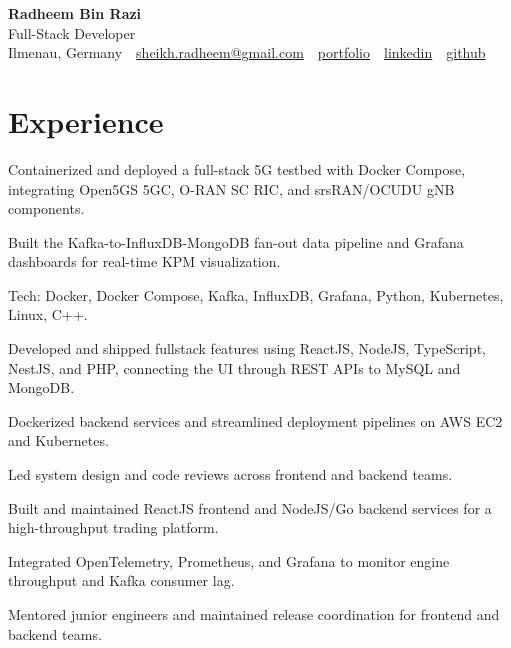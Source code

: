 \documentclass[10pt,a4paper]{resume}
\makeatletter
\newcommand{\Portfolio}{https://radheem.github.io/my-cv}
\newcommand{\PortfolioText}{portfolio}
\newcommand{\GitHub}{https://github.com/radheem}
\newcommand{\LinkedIn}{https://www.linkedin.com/in/radheem-razi}
\newcommand{\Email}{sheikh.radheem@gmail.com}
\makeatother
\begin{document}
\begin{center}
  {\huge\bfseries Radheem Bin Razi}\\[3pt]
  {\large Full-Stack Developer}\\[6pt]
  \small
  Ilmenau, Germany \,\textbar\,
  \href{mailto:\Email}{\Email} \,\textbar\,
  \href{\Portfolio}{\PortfolioText} \,\textbar\,
  \href{\LinkedIn}{linkedin} \,\textbar\,
  \href{\GitHub}{github}
\end{center}
\vspace{2pt}

\section{Experience}

\bullets
  \item Containerized and deployed a full-stack 5G testbed with Docker Compose, integrating Open5GS 5GC, O-RAN SC RIC, and srsRAN/OCUDU gNB components.
  \item Built the Kafka-to-InfluxDB-MongoDB fan-out data pipeline and Grafana dashboards for real-time KPM visualization.
  \item Tech: Docker, Docker Compose, Kafka, InfluxDB, Grafana, Python, Kubernetes, Linux, C++.
\bulletsend
\vspace{1.5pt}
\bullets
  \item Developed and shipped fullstack features using ReactJS, NodeJS, TypeScript, NestJS, and PHP, connecting the UI through REST APIs to MySQL and MongoDB.
  \item Dockerized backend services and streamlined deployment pipelines on AWS EC2 and Kubernetes.
  \item Led system design and code reviews across frontend and backend teams.
\bulletsend
\vspace{1.5pt}
\bullets
  \item Built and maintained ReactJS frontend and NodeJS/Go backend services for a high-throughput trading platform.
  \item Integrated OpenTelemetry, Prometheus, and Grafana to monitor engine throughput and Kafka consumer lag.
  \item Mentored junior engineers and maintained release coordination for frontend and backend teams.
\bulletsend
\vspace{1.5pt}
\end{document}
